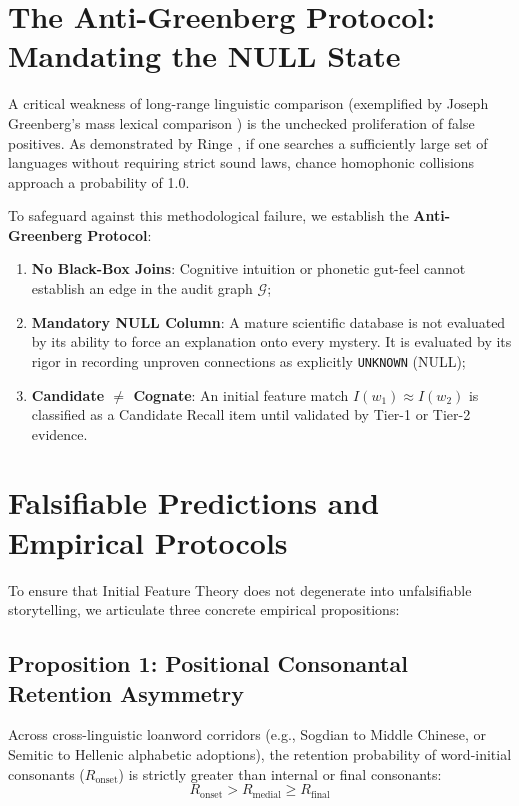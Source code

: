 \documentclass[11pt,a4paper]{article}
\begin{document}
\section{The Anti-Greenberg Protocol: Mandating the NULL State}

A critical weakness of long-range linguistic comparison (exemplified by Joseph Greenberg's mass lexical comparison \cite{greenberg1987language}) is the unchecked proliferation of false positives. As demonstrated by Ringe \cite{ringe1992calculating}, if one searches a sufficiently large set of languages without requiring strict sound laws, chance homophonic collisions approach a probability of 1.0.

To safeguard against this methodological failure, we establish the \textbf{Anti-Greenberg Protocol}:
\begin{enumerate}
    \item \textbf{No Black-Box Joins}: Cognitive intuition or phonetic gut-feel cannot establish an edge in the audit graph $\mathcal{G}$;
    \item \textbf{Mandatory NULL Column}: A mature scientific database is not evaluated by its ability to force an explanation onto every mystery. It is evaluated by its rigor in recording unproven connections as explicitly \texttt{UNKNOWN} (NULL);
    \item \textbf{Candidate $\neq$ Cognate}: An initial feature match $I(w_1) \approx I(w_2)$ is classified as a Candidate Recall item until validated by Tier-1 or Tier-2 evidence.
\end{enumerate}

\section{Falsifiable Predictions and Empirical Protocols}

To ensure that Initial Feature Theory does not degenerate into unfalsifiable storytelling, we articulate three concrete empirical propositions:

\subsection{Proposition 1: Positional Consonantal Retention Asymmetry}
Across cross-linguistic loanword corridors (e.g., Sogdian to Middle Chinese, or Semitic to Hellenic alphabetic adoptions), the retention probability of word-initial consonants ($R_{\text{onset}}$) is strictly greater than internal or final consonants:
\begin{equation}
    R_{\text{onset}} > R_{\text{medial}} \ge R_{\text{final}}
\end{equation}
\end{document}
